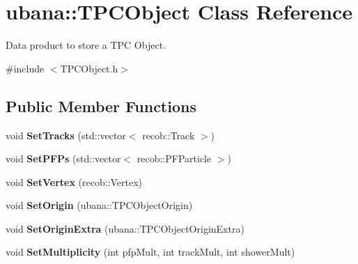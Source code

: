 \hypertarget{classubana_1_1TPCObject}{\section{ubana\-:\-:\-T\-P\-C\-Object \-Class \-Reference}
\label{classubana_1_1TPCObject}
}


\-Data product to store a \-T\-P\-C \-Object.  




{\ttfamily \#include $<$\-T\-P\-C\-Object.\-h$>$}

\subsection*{\-Public \-Member \-Functions}
\begin{DoxyCompactItemize}
\item 
\hypertarget{classubana_1_1TPCObject_a0766c8648ada3d539b474e40a107d8c1}{void {\bfseries \-Set\-Tracks} (std\-::vector$<$ recob\-::\-Track $>$)}\label{classubana_1_1TPCObject_a0766c8648ada3d539b474e40a107d8c1}

\item 
\hypertarget{classubana_1_1TPCObject_ab35b580187ad16cbd53325e8c776f655}{void {\bfseries \-Set\-P\-F\-Ps} (std\-::vector$<$ recob\-::\-P\-F\-Particle $>$)}\label{classubana_1_1TPCObject_ab35b580187ad16cbd53325e8c776f655}

\item 
\hypertarget{classubana_1_1TPCObject_a1fed8d9f87fc301a8cbee484a8434a05}{void {\bfseries \-Set\-Vertex} (recob\-::\-Vertex)}\label{classubana_1_1TPCObject_a1fed8d9f87fc301a8cbee484a8434a05}

\item 
\hypertarget{classubana_1_1TPCObject_ad4946cb455555486b701dd1301a26f56}{void {\bfseries \-Set\-Origin} (ubana\-::\-T\-P\-C\-Object\-Origin)}\label{classubana_1_1TPCObject_ad4946cb455555486b701dd1301a26f56}

\item 
\hypertarget{classubana_1_1TPCObject_a04af7a6b0627988b8ac2e2980f5bc181}{void {\bfseries \-Set\-Origin\-Extra} (ubana\-::\-T\-P\-C\-Object\-Origin\-Extra)}\label{classubana_1_1TPCObject_a04af7a6b0627988b8ac2e2980f5bc181}

\item 
\hypertarget{classubana_1_1TPCObject_aad67da2b0cd00fb82f8eb4d8f87bf18f}{void {\bfseries \-Set\-Multiplicity} (int pfp\-Mult, int track\-Mult, int shower\-Mult)}\label{classubana_1_1TPCObject_aad67da2b0cd00fb82f8eb4d8f87bf18f}


\end{DoxyCompactItemize}
